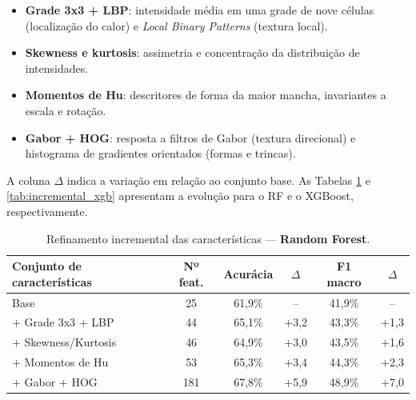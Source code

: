 \documentclass[a4paper,11pt]{article}
\begin{document}
\begin{itemize}[noitemsep]
	\item \textbf{Grade 3x3 + LBP}: intensidade média em uma grade de nove células (localização do calor) e \textit{Local Binary Patterns} (textura local).
	\item \textbf{Skewness e kurtosis}: assimetria e concentração da distribuição de intensidades.
	\item \textbf{Momentos de Hu}: descritores de forma da maior mancha, invariantes a escala e rotação.
	\item \textbf{Gabor + HOG}: resposta a filtros de Gabor (textura direcional) e histograma de gradientes orientados (formas e trincas).
\end{itemize}

A coluna $\Delta$ indica a variação em relação ao conjunto base. As Tabelas \ref{tab:incremental_rf} e \ref{tab:incremental_xgb} apresentam a evolução para o RF e o XGBoost, respectivamente.

\begin{table}[H]
	\centering
	\caption{Refinamento incremental das características --- \textbf{Random Forest}.}
	\label{tab:incremental_rf}
	\vspace{0.2cm}
	\renewcommand{\arraystretch}{1.2}
	\begin{tabular}{l c c c c c}
		\hline
		\textbf{Conjunto de características} & \textbf{Nº feat.} & \textbf{Acurácia} & \textbf{$\Delta$} & \textbf{F1 macro} & \textbf{$\Delta$} \\
		\hline
		Base                 & 25  & 61,9\% & --     & 41,9\% & --     \\ \hline
		+ Grade 3x3 + LBP    & 44  & 65,1\% & +3,2   & 43,3\% & +1,3   \\ \hline
		+ Skewness/Kurtosis  & 46  & 64,9\% & +3,0   & 43,5\% & +1,6   \\ \hline
		+ Momentos de Hu     & 53  & 65,3\% & +3,4   & 44,3\% & +2,3   \\ \hline
		+ Gabor + HOG        & 181 & 67,8\% & +5,9   & 48,9\% & +7,0   \\
		\hline
	\end{tabular}
\end{table}
\end{document}
